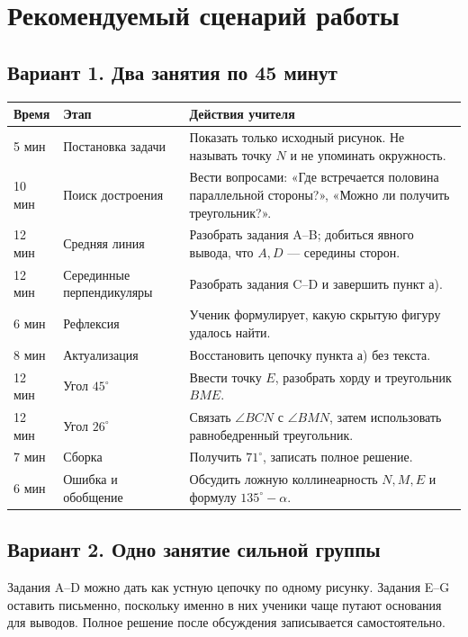 \section{Рекомендуемый сценарий работы}

\subsection{Вариант 1. Два занятия по 45 минут}

\begin{tabularx}{\linewidth}{@{}p{19mm}p{45mm}X@{}}
\toprule
Время & Этап & Действия учителя\\
\midrule
5 мин & Постановка задачи & Показать только исходный рисунок. Не называть
точку \(N\) и не упоминать окружность.\\
10 мин & Поиск достроения & Вести вопросами: «Где встречается половина
параллельной стороны?», «Можно ли получить треугольник?».\\
12 мин & Средняя линия & Разобрать задания A–B; добиться явного вывода,
что \(A,D\) — середины сторон.\\
12 мин & Серединные перпендикуляры & Разобрать задания C–D и завершить пункт а).\\
6 мин & Рефлексия & Ученик формулирует, какую скрытую фигуру удалось найти.\\
\midrule
8 мин & Актуализация & Восстановить цепочку пункта а) без текста.\\
12 мин & Угол \(45^\circ\) & Ввести точку \(E\), разобрать хорду и треугольник
\(BME\).\\
12 мин & Угол \(26^\circ\) & Связать \(\angle BCN\) с \(\angle BMN\), затем
использовать равнобедренный треугольник.\\
7 мин & Сборка & Получить \(71^\circ\), записать полное решение.\\
6 мин & Ошибка и обобщение & Обсудить ложную коллинеарность \(N,M,E\) и
формулу \(135^\circ-\alpha\).\\
\bottomrule
\end{tabularx}

\subsection{Вариант 2. Одно занятие сильной группы}

\begin{teacherbox}
Задания A–D можно дать как устную цепочку по одному рисунку. Задания E–G
оставить письменно, поскольку именно в них ученики чаще путают основания для
выводов. Полное решение после обсуждения записывается самостоятельно.
\end{teacherbox}

